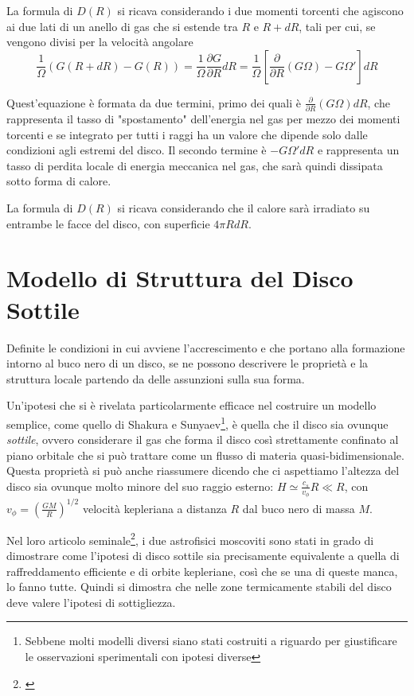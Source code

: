 \documentclass[a4paperbi]{article}
\begin{document}
	La formula di $D(R)$ si ricava considerando i due momenti torcenti che agiscono ai due lati di un anello di gas che si estende tra $R$ e $R+dR$, tali per cui, se vengono divisi per la velocità angolare
	\begin{equation}
		\frac{1}{\Omega}(G(R+dR)-G(R))=\frac{1}{\Omega}\frac{\partial G}{\partial R}dR=\frac{1}{\Omega}\left[\frac{\partial}{\partial R}(G\Omega)-G\Omega'\right]dR
	\end{equation}
	
	Quest'equazione è formata da due termini, primo dei quali è $\frac{\partial}{\partial R}(G\Omega)dR$, che rappresenta il tasso di "spostamento" dell'energia nel gas per mezzo dei momenti torcenti e se integrato per tutti i raggi ha un valore che dipende solo dalle condizioni agli estremi del disco. Il secondo termine è $-G\Omega'dR$ e rappresenta un tasso di perdita locale di energia meccanica nel gas, che sarà quindi dissipata sotto forma di calore.
	
	La formula di $D(R)$ si ricava considerando che il calore sarà irradiato su entrambe le facce del disco, con superficie $4\pi RdR$.
	
\newpage
\section{Modello di Struttura del Disco Sottile}
	Definite le condizioni in cui avviene l'accrescimento e che portano alla formazione intorno al buco nero di un disco, se ne possono descrivere le proprietà e la struttura locale partendo da delle assunzioni sulla sua forma. 

	Un'ipotesi che si è rivelata particolarmente efficace nel costruire un modello semplice, come quello di Shakura e Sunyaev\footnote{Sebbene molti modelli diversi siano stati costruiti a riguardo per giustificare le osservazioni sperimentali con ipotesi diverse}, è quella che il disco sia ovunque \textit{sottile}, ovvero considerare il gas che forma il disco così strettamente confinato al piano orbitale che si può trattare come un flusso di materia quasi-bidimensionale. Questa proprietà si può anche riassumere dicendo che ci aspettiamo l'altezza del disco sia ovunque molto minore del suo raggio esterno: $H\simeq\frac{c_s}{v_\phi}R\ll R$, con $v_\phi=\left(\frac{GM}{R}\right)^{1/2}$ velocità kepleriana a distanza $R$ dal buco nero di massa $M$.
	
	Nel loro articolo seminale\footnote{\cite{ShakuraSunyaev1973}}, i due astrofisici moscoviti sono stati in grado di dimostrare come l'ipotesi di disco sottile sia precisamente equivalente a quella di raffreddamento efficiente e di orbite kepleriane, così che se una di queste manca, lo fanno tutte. Quindi si dimostra che nelle zone termicamente stabili del disco deve valere l'ipotesi di sottigliezza.
	
\end{document}
